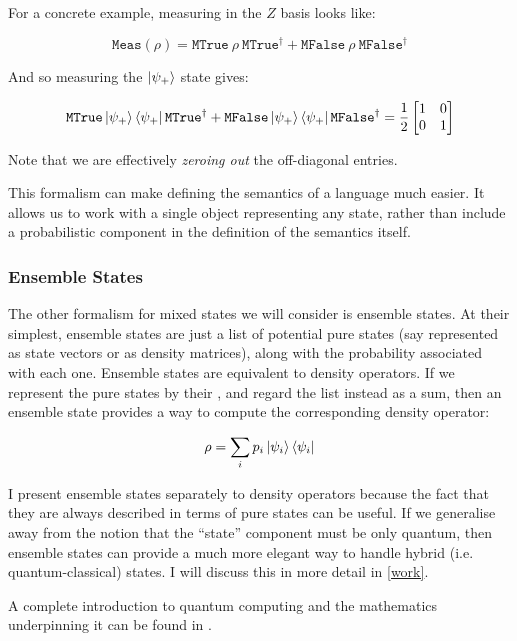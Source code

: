 \noindent For a concrete example, measuring in the $Z$ basis looks like:

$$
\texttt{Meas}(\rho) = \texttt{MTrue}\ \rho\ \texttt{MTrue}^\dagger + \texttt{MFalse}\ \rho\ \texttt{MFalse}^\dagger
$$

\noindent And so measuring the $\ket{\psi_+}$ state gives:

$$
\texttt{MTrue}\ket{\psi_+}\bra{\psi_+} \texttt{MTrue}^\dagger + \texttt{MFalse}\ket{\psi_+}\bra{\psi_+} \texttt{MFalse}^\dagger
= \frac{1}{2} \begin{bmatrix}
  1 & 0\\
  0 & 1
\end{bmatrix}
$$


\noindent Note that we are effectively \emph{zeroing out} the off-diagonal entries.


This formalism can make defining the semantics of a language much easier. 
% 
It allows us to work with a single object representing any state, rather than include a probabilistic component in the definition of the semantics itself.

\subsubsection{Ensemble States} 

The other formalism ƒor mixed states we will consider is ensemble states.
% 
At their simplest, ensemble states are just a list of potential pure states (say represented as state
vectors or as density matrices), along with the probability associated with each one. 
% 
Ensemble states are equivalent to density operators. 
% 
If we represent the pure states by their , and regard the list instead as a sum, 
then an ensemble state provides a way to compute the corresponding density operator:

$$
  \rho = \sum_i p_i \ket{\psi_i} \bra{\psi_i}
$$

I present ensemble states separately to density operators because the fact that they are
always described in terms of pure states can be useful.
% 
If we generalise away from the notion that the ``state'' component must be only quantum,
then ensemble states can provide a much more elegant way to handle hybrid (i.e. quantum-classical) states.
% 
I will discuss this in more detail in \cref{work}.


A complete introduction to quantum computing and the mathematics underpinning it can be found in \cite{Nielsen_Chuang_2010_Bible}.